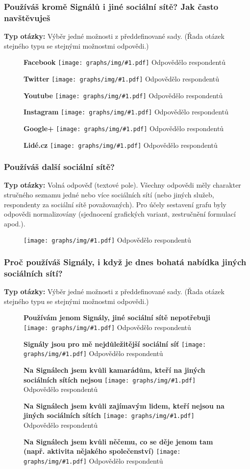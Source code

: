 \documentclass[12pt, a4paper, twoside]{article}
\newcommand{\answercount}[1]{Odpovědělo  respondentů}
\newcommand{\includegraph}[2]{
  \begin{figure}[H]
    \centering
    \textbf{#2}
    \texttt{[image: graphs/img/\#1.pdf]}
    \answercount{#1}
  \end{figure}
}
\newcommand{\qtype}{\textbf{Typ otázky:}
}
\newcommand{\pickOne}{Výběr jedné možnosti z předdefinované sady\xspace}
\newcommand{\series}{(Řada otázek stejného typu se stejnými možnostmi odpovědi.)\xspace}
\newcommand{\freeEntry}{Volná odpověď (textové pole)}
\begin{document}
\subsubsection{Používáš kromě Signálů i jiné sociální sítě? Jak často navštěvuješ}

\qtype \pickOne. \series

\includegraph{jine_site_Facebook}{Facebook}

\includegraph{jine_site_Twitter}{Twitter}

\includegraph{jine_site_Youtube}{Youtube}

\includegraph{jine_site_Instagram}{Instagram}

\includegraph{jine_site_Googleplus}{Google+}

\includegraph{jine_site_Lidecz}{Lidé.cz}

\pagebreak

\subsubsection{Používáš další sociální sítě?}

\qtype \freeEntry.
Všechny odpovědi měly charakter stručného seznamu jedné nebo více
sociálních sítí (nebo jiných služeb, respondenty za sociální sítě
považovaných). Pro účely sestavení grafu byly odpovědi normalizovány
(sjednocení grafických variant, zestručnění formulací apod.).

\includegraph{pouzivas_dalsi_socialni_site}{}

\subsubsection{Proč používáš Signály, i když je dnes bohatá nabídka jiných sociálních sítí?}

\qtype \pickOne. \series

\includegraph{proc_signaly_jenom_signaly}{Používám jenom Signály, jiné sociální sítě nepotřebuji}

\includegraph{proc_signaly_signaly_nejdulezitejsi}{Signály jsou pro mě nejdůležitější sociální síť}

\includegraph{proc_signaly_kamaradi_kteri_jinde_nejsou}{Na Signálech jsem kvůli kamarádům, kteří na jiných sociálních sítích nejsou}

\includegraph{proc_signaly_zajimavi_lide_kteri_jinde_nejsou}{Na Signálech jsem kvůli zajímavým lidem, kteří nejsou na jiných sociálních sítích}

\includegraph{proc_signaly_jedinecna_aktivita}{Na Signálech jsem kvůli něčemu, co se děje jenom tam (např. aktivita nějakého společenství)}
\end{document}
